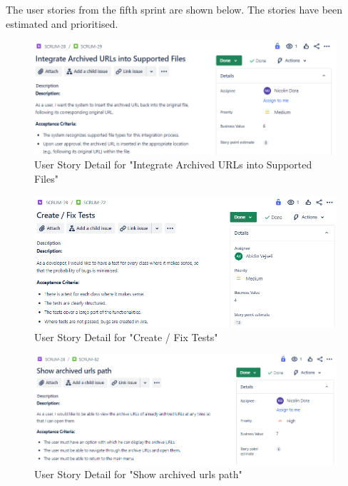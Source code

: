 The user stories from the fifth sprint are shown below. The stories have been estimated and prioritised.
\begin{figure}[h!]
    \centering
    \includegraphics[width=1\textwidth]{pictures/Scrum/Sprint 5/UserStory_10}
    \caption{User Story Detail for "Integrate Archived URLs into Supported Files"}
    \label{fig:sprint_5_userstory_1}
\end{figure}
\begin{figure}[h!]
    \centering
    \includegraphics[width=1\textwidth]{pictures/Scrum/Sprint 5/UserStory_23}
    \caption{User Story Detail for "Create / Fix Tests"}
    \label{fig:sprint_5_userstory_2}
\end{figure}
\begin{figure}[h!]
    \centering
    \includegraphics[width=1\textwidth]{pictures/Scrum/Sprint 5/UserStory_25}
    \caption{User Story Detail for "Show archived urls path"}
    \label{fig:sprint_5_userstory_3}
\end{figure}

